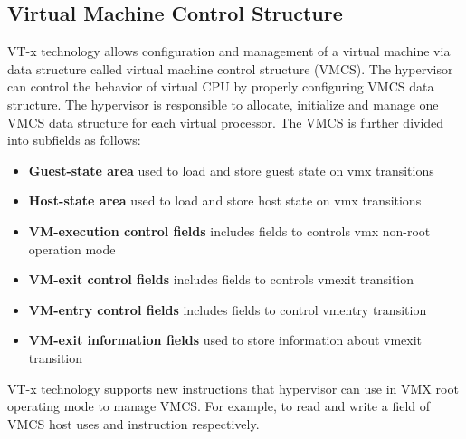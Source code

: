 \subsection{Virtual Machine Control Structure}
VT-x technology allows configuration and management of a virtual machine via data structure called virtual machine control structure (VMCS).
The hypervisor can control the behavior of virtual CPU by properly configuring VMCS data structure.
The hypervisor is responsible to allocate, initialize and manage one VMCS data structure for each virtual processor.
The VMCS is further divided into subfields as follows:
\begin{itemize}
	\item \textbf{Guest-state area} used to load and store guest state on vmx transitions
	\item \textbf{Host-state area} used to load and store host state on vmx transitions
	\item \textbf{VM-execution control fields} includes fields to controls vmx non-root operation mode
	\item \textbf{VM-exit control fields} includes fields to controls vmexit transition
	\item \textbf{VM-entry control fields} includes fields to control vmentry transition
	\item \textbf{VM-exit information fields} used to store information about vmexit transition
\end{itemize}

VT-x technology supports new instructions that hypervisor can use in VMX root operating mode to manage VMCS.
For example, to read and write a field of VMCS host uses \mVMREAD{} and \mVMWRITE{} instruction respectively.



